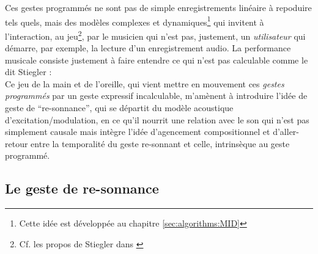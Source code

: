 \indent Ces gestes programmés ne sont pas de simple enregistrements linéaire à repoduire tels quels, mais des modèles complexes et dynamiques\footnote{Cette idée est développée au chapitre \ref{sec:algorithms:MID}} qui invitent à l'interaction, au jeu\footnote{Cf. les propos de Stiegler dans \cite{stiegler_circuit_2004} }, par le musicien qui n'est pas, justement, un \textit{utilisateur} qui démarre, par exemple, la lecture d'un enregistrement audio. La performance musicale consiste justement à faire entendre ce qui n'est pas calculable comme le dit Stiegler \cite{stiegler_circuit_2004}: \\
\indent Ce jeu de la main et de l'oreille, qui vient mettre en mouvement ces \textit{gestes programmés} par un geste expressif incalculable, m'amènent à introduire l'idée de geste de ``re-sonnance'', qui se départit du modèle acoustique d'excitation/modulation, en ce qu'il nourrit une relation avec le son qui n'est pas simplement causale mais intègre l'idée d'agencement compositionnel et d'aller-retour entre la temporalité du geste re-sonnant et celle, intrinsèque au geste programmé.

\subsection{Le geste de re-sonnance}

